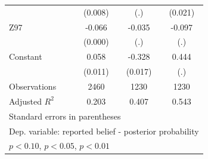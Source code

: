 \begin{table}[htbp]
\begin{tabular}{l*{3}{c}}
                &  (0.008)         &      (.)         &  (0.021)         \\
Z97             &   -0.066\sym{***}&   -0.035         &   -0.097         \\
                &  (0.000)         &      (.)         &      (.)         \\
Constant        &    0.058\sym{***}&   -0.328\sym{***}&    0.444         \\
                &  (0.011)         &  (0.017)         &      (.)         \\
\hline
Observations    &     2460         &     1230         &     1230         \\
Adjusted \(R^{2}\)&    0.203         &    0.407         &    0.543         \\
\hline\hline
\multicolumn{4}{l}{\footnotesize Standard errors in parentheses}\\
\multicolumn{4}{l}{\footnotesize Dep. variable: reported belief - posterior probability}\\
\multicolumn{4}{l}{\footnotesize \sym{*} \(p<0.10\), \sym{**} \(p<0.05\), \sym{***} \(p<0.01\)}\\
\end{tabular}
\end{table}
